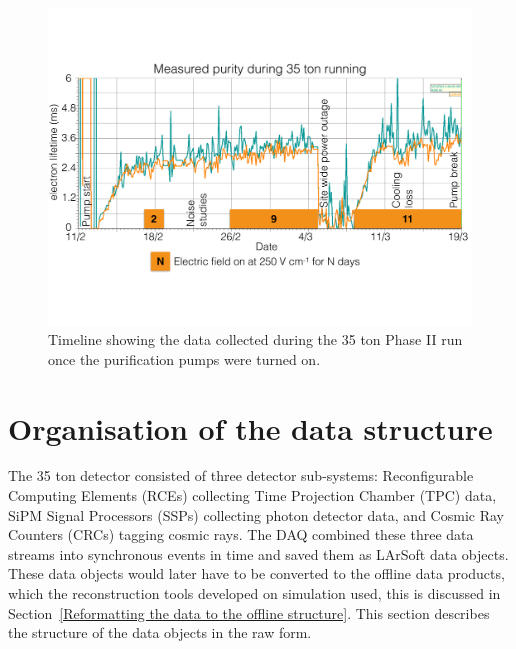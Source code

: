 \begin{figure}
  \centering
  \includegraphics[width=1.0\textwidth]{DataCollected}
  \caption[The 35 ton data sample]{Timeline showing the data collected during the 35 ton Phase II run once the purification pumps were turned on.}
  \label{fig:DataCollected}  
\end{figure}

\section{Organisation of the data structure} \label{Organisation of the data structure} %
The 35 ton detector consisted of three detector sub-systems: Reconfigurable Computing Elements (RCEs) collecting Time Projection Chamber (TPC) data, SiPM Signal Processors (SSPs) collecting photon detector data, and Cosmic Ray Counters (CRCs) tagging cosmic rays. The DAQ combined these three data streams into synchronous events in time and saved them as LArSoft data objects. These data objects would later have to be converted to the offline data products, which the reconstruction tools developed on simulation used, this is discussed in Section~\ref{Reformatting the data to the offline structure}. This section describes the structure of the data objects in the raw form.\\

